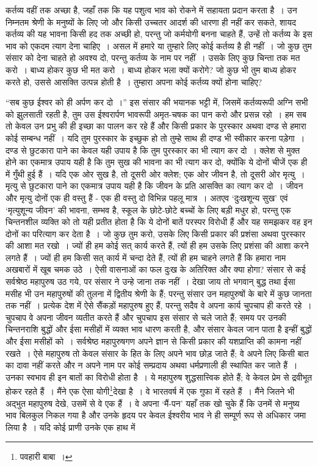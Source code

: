 कर्तव्य वहीं तक अच्छा है, जहाँ तक कि यह पशुत्व भाव को रोकने में सहायता प्रदान करता है~। उन निम्नतम श्रेणी के मनुष्यों के लिए जो और किसी उच्चतर आदर्श की धारणा ही नहीं कर सकते, शायद कर्तव्य की यह भावना किसी हद तक अच्छी हो, परन्तु जो कर्मयोगी बनना चाहते हैं, उन्हें तो कर्तव्य के इस भाव को एकदम त्याग देना चाहिए~। असल में हमारे या तुम्हारे लिए कोई कर्तव्य है ही नहीं~। जो कुछ तुम संसार को देना चाहते हो अवश्य दो, परन्तु कर्तव्य के नाम पर नहीं~। उसके लिए कुछ चिन्ता तक मत करो~। बाध्य होकर कुछ भी मत करो~। बाध्य होकर भला क्यों करोगे? जो कुछ भी तुम बाध्य होकर करते हो, उससे आसक्ति उत्पन्न होती है~। तुम्हारा अपना कोई कर्तव्य क्यों होना चाहिए?

“सब कुछ ईश्वर को ही अर्पण कर दो~।” इस संसार की भयानक भट्टी में, जिसमें कर्तव्यरूपी अग्नि सभी को झुलसाती रहती है, तुम उस ईश्वरार्पण भावरूपी अमृत-चषक का पान करो और प्रसन्न रहो~। हम सब तो केवल उन प्रभु की ही इच्छा का पालन कर रहे हैं और किसी प्रकार के पुरस्कार अथवा दण्ड से हमारा कोई सम्बन्ध नहीं~। यदि तुम पुरस्कार के इच्छुक हो तो तुम्हे साथ ही दण्ड भी स्वीकार करना पड़ेगा~। दण्ड से छुटकारा पाने का केवल यही उपाय है कि तुम पुरस्कार का भी त्याग कर दो~। क्लेश से मुक्त होने का एकमात्र उपाय यही है कि तुम सुख की भावना का भी त्याग कर दो, क्योंकि ये दोनों चीजें एक ही में गुँथी हुई हैं~। यदि एक ओर सुख है, तो दूसरी ओर क्लेश; एक ओर जीवन है, तो दूसरी ओर मृत्यु~। मृत्यु से छुटकारा पाने का एकमात्र उपाय यही है कि जीवन के प्रति आसक्ति का त्याग कर दो~। जीवन और मृत्यु दोनों एक ही वस्तु हैं - एक ही वस्तु दो विभिन्न पहलू मात्र~। अतएव ‘दुःखशून्य सुख’ एवं ‘मृत्युशून्य जीवन’ की भावना, सम्भव है, स्कूल के छोटे-छोटे बच्चों के लिए बड़ी मधुर हो, परन्तु एक चिन्तनशील व्यक्ति को तो यही प्रतीत होता है कि ये दोनों बातें परस्पर विरोधी हैं और यह समझकर वह इन दोनों का परित्याग कर देता है~। जो कुछ तुम करो, उसके लिए किसी प्रकार की प्रशंसा अथवा पुरस्कार की आशा मत रखो~। ज्यों ही हम कोई सत् कार्य करते हैं, त्यों ही हम उसके लिए प्रशंसा की आशा करने लगते हैं~। ज्यों ही हम किसी सत् कार्य में चन्दा देते हैं, त्यों ही हम चाहने लगते हैं कि हमारा नाम अखबारों में खूब चमक उठे~। ऐसी वासनाओं का फल दुःख के अतिरिक्त और क्या होगा? संसार से कई सर्वश्रेष्ठ महापुरुष उठ गये, पर संसार ने उन्हे जाना तक नहीं~। देखा जाय तो भगवान् बुद्ध तथा ईसा मसीह भी उन महापुरुषों की तुलना में द्वितीय श्रेणी के हैं; परन्तु संसार उन महापुरुषों के बारे में कुछ जानता तक नहीं~। प्रत्येक देश में ऐसे सैंकड़ों महापुरुष हुए हैं, परन्तु सदैव वे अपना कार्य चुपचाप ही करते रहे~। चुपचाप वे अपना जीवन व्यतीत करते हैं और चुपचाप इस संसार से चले जाते हैं; समय पर उनकी चिन्तनराशि बुद्धों और ईसा मसीहों में व्यक्त भाव धारण करती है, और संसार केवल जान पाता है इन्हीं बुद्धों और ईसा मसीहों को~। सर्वश्रेष्ठ महापुरुषगण अपने ज्ञान से किसी प्रकार की यशप्राप्ति की कामना नहीं रखते~। ऐसे महापुरुष तो केवल संसार के हित के लिए अपने भाव छोड़ जाते हैं; वे अपने लिए किसी बात का दावा नहीं करते और न अपने नाम पर कोई सम्प्रदाय अथवा धर्मप्रणाली ही स्थापित कर जाते हैं~। उनका स्वभाव ही इन बातों का विरोधी होता है~। ये महापुरुष शुद्धसात्त्विक होते हैं; वे केवल प्रेम से द्रवीभूत होकर रहते हैं~। मैंने एक ऐसा योगी\footnote{पवहारी बाबा~।}देखा है~। वे भारतवर्ष में एक गुफा में रहते हैं~। मैंने जितने भी अद्भुत महापुरुष देखे, उसमें से वे एक हैं~। वे अपना ‘मैं-पन’ यहाँ तक खो चुके हैं कि उनमें से मनुष्य भाव बिलकुल निकल गया है और उनके हृदय पर केवल ईश्वरीय भाव ने ही सम्पूर्ण रूप से अधिकार जमा लिया है~। यदि कोई प्राणी उनके एक हाथ में 